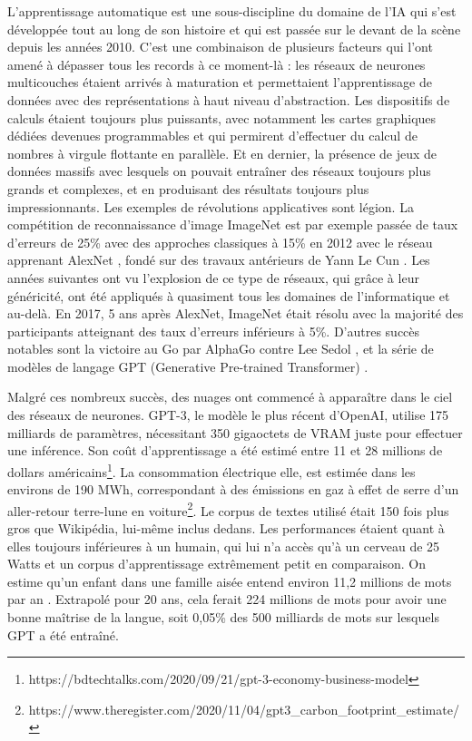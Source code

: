 	L'apprentissage automatique est une sous-discipline du domaine de l'IA qui s'est développée tout au long de son histoire et qui est passée sur le devant de la scène depuis les années 2010. C'est une combinaison de plusieurs facteurs qui l'ont amené à dépasser tous les records à ce moment-là : les réseaux de neurones multicouches étaient arrivés à maturation et permettaient l'apprentissage de données avec des représentations à haut niveau d'abstraction. Les dispositifs de calculs étaient toujours plus puissants, avec notamment les cartes graphiques dédiées devenues programmables et qui permirent d'effectuer du calcul de nombres à virgule flottante en parallèle. Et en dernier, la présence de jeux de données massifs avec lesquels on pouvait entraîner des réseaux toujours plus grands et complexes, et en produisant des résultats toujours plus impressionnants. Les exemples de révolutions applicatives sont légion. La compétition de reconnaissance d'image ImageNet est par exemple passée de taux d'erreurs de 25\% avec des approches classiques à 15\% en 2012 avec le réseau apprenant AlexNet \cite{krizhevsky2012imagenet}, fondé sur des travaux antérieurs de Yann Le Cun \cite{lecun1989backpropagation}. Les années suivantes ont vu l'explosion de ce type de réseaux, qui grâce à leur généricité, ont été appliqués à quasiment tous les domaines de l'informatique et au-delà. En 2017, 5 ans après AlexNet, ImageNet était résolu avec la majorité des participants atteignant des taux d'erreurs inférieurs à 5\%. D'autres succès notables sont la victoire au Go par AlphaGo contre Lee Sedol \cite{silver2016mastering}, et la série de modèles de langage GPT (Generative Pre-trained Transformer) \cite{brown2020language}.

	Malgré ces nombreux succès, des nuages ont commencé à apparaître dans le ciel des réseaux de neurones. GPT-3, le modèle le plus récent d'OpenAI, utilise 175 milliards de paramètres, nécessitant 350 gigaoctets de VRAM juste pour effectuer une inférence. Son coût d'apprentissage a été estimé entre 11 et 28 millions de dollars américains\footnote{https://bdtechtalks.com/2020/09/21/gpt-3-economy-business-model}. La consommation électrique elle, est estimée dans les environs de 190 MWh, correspondant à des émissions en gaz à effet de serre d'un aller-retour terre-lune en voiture\footnote{https://www.theregister.com/2020/11/04/gpt3\_carbon\_footprint\_estimate/}. Le corpus de textes utilisé était 150 fois plus gros que Wikipédia, lui-même inclus dedans. Les performances étaient quant à elles toujours inférieures à un humain, qui lui n'a accès qu'à un cerveau de 25 Watts \cite{kandel2000principles} et un corpus d'apprentissage extrêmement petit en comparaison. On estime qu'un enfant dans une famille aisée entend environ 11,2 millions de mots par an \cite{hart2003early}. Extrapolé pour 20 ans, cela ferait 224 millions de mots pour avoir une bonne maîtrise de la langue, soit 0,05\% des 500 milliards de mots sur lesquels GPT a été entraîné.

